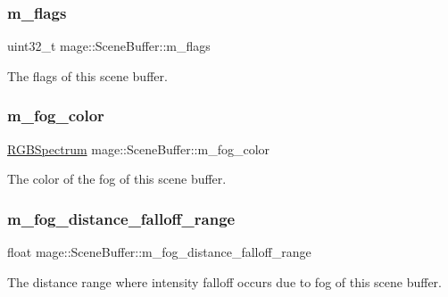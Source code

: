 \subsubsection{\texorpdfstring{m\+\_\+flags}{m\_flags}}
{\footnotesize\ttfamily uint32\+\_\+t mage\+::\+Scene\+Buffer\+::m\+\_\+flags}

The flags of this scene buffer. \hypertarget{structmage_1_1_scene_buffer_ab45b78ce0869b32b8540b86606691c5f}{}\label{structmage_1_1_scene_buffer_ab45b78ce0869b32b8540b86606691c5f} 
\subsubsection{\texorpdfstring{m\+\_\+fog\+\_\+color}{m\_fog\_color}}
{\footnotesize\ttfamily \hyperlink{structmage_1_1_r_g_b_spectrum}{R\+G\+B\+Spectrum} mage\+::\+Scene\+Buffer\+::m\+\_\+fog\+\_\+color}

The color of the fog of this scene buffer. \hypertarget{structmage_1_1_scene_buffer_a7c3da84f1ae309bd937f9ef4b3b16cf6}{}\label{structmage_1_1_scene_buffer_a7c3da84f1ae309bd937f9ef4b3b16cf6} 
\subsubsection{\texorpdfstring{m\+\_\+fog\+\_\+distance\+\_\+falloff\+\_\+range}{m\_fog\_distance\_falloff\_range}}
{\footnotesize\ttfamily float mage\+::\+Scene\+Buffer\+::m\+\_\+fog\+\_\+distance\+\_\+falloff\+\_\+range}

The distance range where intensity falloff occurs due to fog of this scene buffer. \hypertarget{structmage_1_1_scene_buffer_ae50839fce649b4315d4f89055048559d}{}\label{structmage_1_1_scene_buffer_ae50839fce649b4315d4f89055048559d} 
